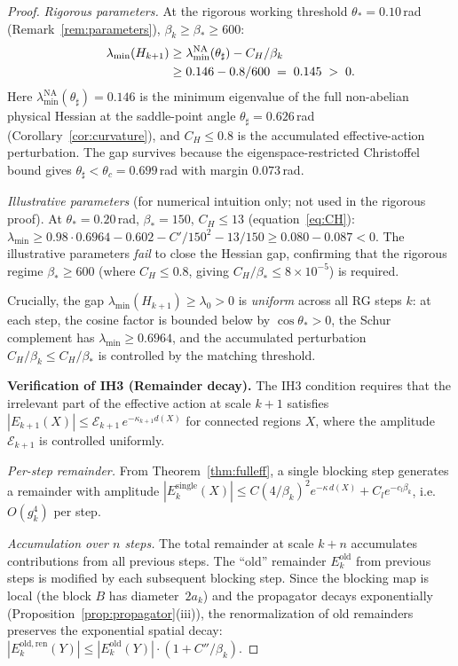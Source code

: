 \documentclass[11pt]{article}
\theoremstyle{definition}
\begin{document}
\begin{proof}
\smallskip\noindent\emph{Rigorous parameters.}
At the rigorous working threshold $\theta_*=0.10$\,rad
(Remark~\ref{rem:parameters}), $\beta_k\ge\beta_*\ge 600$:
\begin{align}
\lambda_{\min}(H_{k+1})
&\ge\lambda_{\min}^{\mathrm{NA}}(\theta_\sharp)-C_H/\beta_k\notag\\
&\ge 0.146-0.8/600\;=\;0.145\;>\;0.
\end{align}
Here $\lambda_{\min}^{\mathrm{NA}}(\theta_\sharp)=0.146$ is the
minimum eigenvalue of the full non-abelian physical Hessian at the
saddle-point angle $\theta_\sharp=0.626$\,rad
(Corollary~\ref{cor:curvature}), and $C_H\le 0.8$
is the accumulated effective-action perturbation.
The gap survives because the eigenspace-restricted Christoffel
bound gives $\theta_\sharp<\theta_c=0.699$\,rad with margin
$0.073$\,rad.

\smallskip\noindent\emph{Illustrative parameters} (for
numerical intuition only; not used in the rigorous proof).
At $\theta_*=0.20$\,rad, $\beta_*=150$, $C_H\le 13$
(equation~\eqref{eq:CH}):
$\lambda_{\min}\ge 0.98\cdot 0.6964-0.602-C'/150^2
-13/150\ge 0.080-0.087<0$.
The illustrative parameters \emph{fail} to close the
Hessian gap, confirming that the rigorous regime
$\beta_*\ge 600$ (where $C_H\le 0.8$,
giving $C_H/\beta_*\le 8\times 10^{-5}$) is required.

Crucially, the gap $\lambda_{\min}(H_{k+1})\ge\lambda_0>0$ is
\emph{uniform} across all RG steps $k$: at each step, the cosine
factor is bounded below by $\cos\theta_*>0$, the Schur complement
has $\lambda_{\min}\ge 0.6964$, and the accumulated
perturbation $C_H/\beta_k\le C_H/\beta_*$ is controlled by
the matching threshold.

\medskip\noindent\textbf{Verification of IH3 (Remainder decay).}
The IH3 condition requires that the irrelevant part of the effective
action at scale $k+1$ satisfies
$|E_{k+1}(X)|\le\mathcal{E}_{k+1}\,e^{-\kappa_{k+1} d(X)}$
for connected regions $X$, where the amplitude
$\mathcal{E}_{k+1}$ is controlled uniformly.

\smallskip\noindent\emph{Per-step remainder.}
From Theorem~\ref{thm:fulleff}, a single blocking step generates
a remainder with amplitude
$|E_k^{\mathrm{single}}(X)|\le C(4/\beta_k)^2 e^{-\kappa\,d(X)}
+C_l e^{-c_l\beta_k}$,
i.e.\ $O(g_k^4)$ per step.

\smallskip\noindent\emph{Accumulation over $n$ steps.}
The total remainder at scale $k{+}n$ accumulates contributions
from all previous steps.  The ``old'' remainder $E_k^{\mathrm{old}}$
from previous steps is modified by each subsequent blocking step.
Since the blocking map is local (the block $B$ has
diameter~$2a_k$) and the propagator decays exponentially
(Proposition~\ref{prop:propagator}(iii)), the renormalization of
old remainders preserves the exponential spatial decay:
$|E_k^{\mathrm{old,ren}}(Y)|\le|E_k^{\mathrm{old}}(Y)|
\cdot(1+C''/\beta_k)$.


\end{proof}
\end{document}
